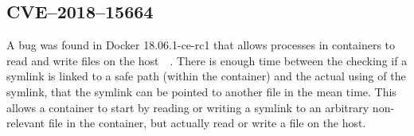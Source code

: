\subsection{CVE--2018--15664}
A bug was found in Docker 18.06.1-ce-rc1 that allows processes in containers to read and write files on the host~\cite{CVE-2018-15664-Openwall}~\cite{CVE-2018-15664-Bugzilla}. There is enough time between the checking if a symlink is linked to a safe path (within the container) and the actual using of the symlink, that the symlink can be pointed to another file in the mean time. This allows a container to start by reading or writing a symlink to an arbitrary non-relevant file in the container, but actually read or write a file on the host.
